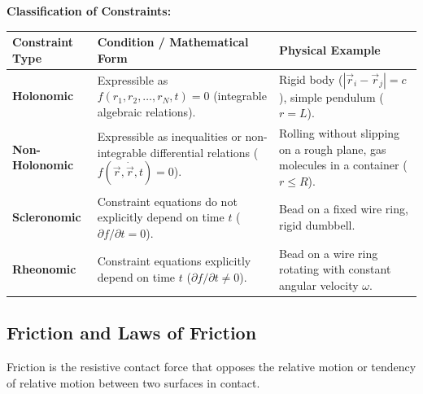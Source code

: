 \documentclass[12pt,a4paper]{article}
\begin{document}
\textbf{Classification of Constraints:}\par\vspace{6pt}\noindent
\begin{tabularx}{\linewidth}{|B{3.2cm}|Y|Y|}
\hline
\textbf{Constraint Type} & \textbf{Condition / Mathematical Form} & \textbf{Physical Example} \\
\hline
\textbf{Holonomic} & Expressible as $f(r_1, r_2, \ldots, r_N, t) = 0$ (integrable algebraic relations). & Rigid body ($|\vec{r}_i - \vec{r}_j| = c$), simple pendulum ($r = L$). \\
\hline
\textbf{Non-Holonomic} & Expressible as inequalities or non-integrable differential relations ($f(\vec{r}, \dot{\vec{r}}, t) = 0$). & Rolling without slipping on a rough plane, gas molecules in a container ($r \le R$). \\
\hline
\textbf{Scleronomic} & Constraint equations do not explicitly depend on time $t$ ($\partial f / \partial t = 0$). & Bead on a fixed wire ring, rigid dumbbell. \\
\hline
\textbf{Rheonomic} & Constraint equations explicitly depend on time $t$ ($\partial f / \partial t \neq 0$). & Bead on a wire ring rotating with constant angular velocity $\omega$. \\
\hline
\end{tabularx}

\subsection{Friction and Laws of Friction}

Friction is the resistive contact force that opposes the relative motion or tendency of relative motion between two surfaces in contact.
\end{document}
